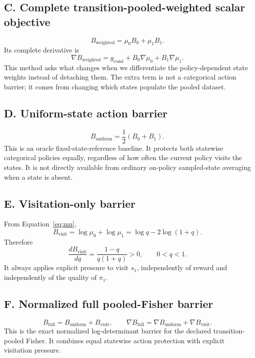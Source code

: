 \documentclass[10pt,a4paper]{article}
\begin{document}
\subsection{C. Complete transition-pooled-weighted scalar objective}
\begin{equation}
B_{\mathrm{weighted}}=\mu_0B_0+\mu_1B_1.
\end{equation}
Its complete derivative is
\begin{equation}
\boxed{
\nabla B_{\mathrm{weighted}}
=g_{\mathrm{cond}}+B_0\nabla\mu_0+B_1\nabla\mu_1.}
\label{eq:weighted-gradient}
\end{equation}
This method asks what changes when we differentiate the policy-dependent state
weights instead of detaching them.  The extra term is not a categorical action
barrier; it comes from changing which states populate the pooled dataset.

\subsection{D. Uniform-state action barrier}
\begin{equation}
B_{\mathrm{uniform}}=\frac12(B_0+B_1).
\end{equation}
This is an oracle fixed-state-reference baseline.  It protects both statewise
categorical policies equally, regardless of how often the current policy visits
the states.  It is not directly available from ordinary on-policy sampled-state
averaging when a state is absent.

\subsection{E. Visitation-only barrier}
From Equation~\eqref{eq:mu},
\begin{equation}
B_{\mathrm{visit}}
=\log\mu_0+\log\mu_1
=\log q-2\log(1+q).
\end{equation}
Therefore
\begin{equation}
\frac{dB_{\mathrm{visit}}}{dq}
=\frac{1-q}{q(1+q)}>0,
\qquad 0<q<1.
\label{eq:visit-derivative}
\end{equation}
It always applies explicit pressure to visit $s_1$, independently of reward and
independently of the quality of $\pi_1$.

\subsection{F. Normalized full pooled-Fisher barrier}
\begin{equation}
B_{\mathrm{full}}
=B_{\mathrm{uniform}}+B_{\mathrm{visit}},
\qquad
\nabla B_{\mathrm{full}}
=\nabla B_{\mathrm{uniform}}+\nabla B_{\mathrm{visit}}.
\label{eq:full-gradient}
\end{equation}
This is the exact normalized log-determinant barrier for the declared
transition-pooled Fisher.  It combines equal statewise action protection with
explicit visitation pressure.
\end{document}
